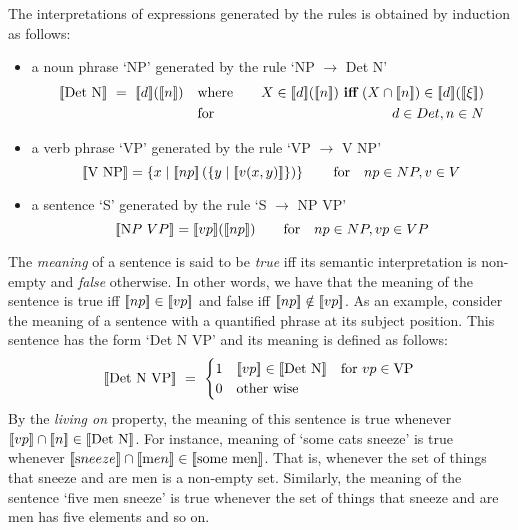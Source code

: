 \noindent
The interpretations of  expressions generated by the rules is obtained  by induction as follows:

\begin{itemize}
\item a noun phrase `NP' generated by the rule  `NP $\to$ Det N'  
\begin{eqnarray*}
\semantics{\mbox{Det N}} \ = \  \semantics{d}(\semantics{n})  
&\quad\text{where} \quad&  X \in \semantics{d}(\semantics{n}) \ \text{\bf iff} \ (X \cap \semantics{n}) \in \semantics{d}(\semantics{\xi})\\
&\quad \text{for} \quad&  d \in Det,  n \in N 
\end{eqnarray*}
\item a verb phrase `VP' generated by the rule `VP $\to$ V NP' 
\[
[\![ \mbox{V NP} ]\!] = \left\{x \mid [\![ np ]\!]\left(\{y \mid [\![ v( x, y) ]\!]\}\right)\right\} \qquad
 \text{for} \quad  np \in NP,  v \in V  
\]
\item a sentence `S' generated by the rule `S $\to$ NP VP'
\[
[\![ \text NP \ VP ]\!] = [\![ vp ]\!]([\![ np ]\!]) \qquad
 \text{for} \quad  np \in NP,  vp \in VP
\]
\end{itemize}


\bigskip
The \emph{meaning} of a sentence is  said to be  \emph{true} iff its semantic interpretation is non-empty and \emph{false} otherwise. In other words, we have that the meaning of the sentence is true  iff $[\![ np ]\!] \in [\![ vp ]\!]$ and false iff $[\![ np ]\!] \notin [\![ vp ]\!]$.  As an example, consider the  meaning of a sentence with a quantified phrase at its subject position. This sentence has the form  `Det N VP'  and its meaning is defined as follows:
\[
[\![ \mbox{Det N VP} ]\!] \ = \ \begin{cases} 1 & [\![ vp ]\!] \in [\![ \mbox{Det N} ]\!]  \quad \text{for} \ vp \in \text{VP}\\
0 & \mbox{other wise}
\end{cases}
\]
By the \emph{living on} property, the meaning of this sentence is true whenever  $[\![ vp ]\!] \cap [\![ n ]\!] \in [\![ \mbox{Det N} ]\!]$. For instance, meaning of `some cats sneeze' is true whenever $[\![ \text sneeze ]\!] \cap [\![ \text men ]\!] \in [\![ \mbox{some men} ]\!]$. That is, whenever the set of things that sneeze and are men is a non-empty set. Similarly, the meaning of the  sentence `five men sneeze' is true whenever the set of things that sneeze and are men has five elements and so on.  


